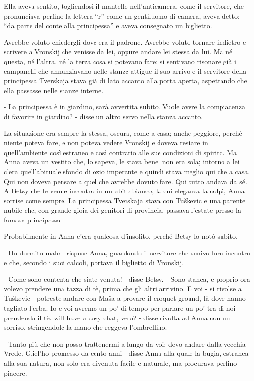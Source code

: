 Ella aveva sentito, togliendosi il mantello nell'anticamera, come il servitore, che pronunciava perfino la lettera ``r'' come un gentiluomo di camera, aveva detto: ``da parte del conte alla principessa'' e aveva consegnato un biglietto. 

Avrebbe voluto chiedergli dove era il padrone. Avrebbe voluto tornare indietro e scrivere a Vronskij che venisse da lei, oppure andare lei stessa da lui. Ma né questa, né l'altra, né la terza cosa si potevano fare: si sentivano risonare già i campanelli che annunziavano nelle stanze attigue il suo arrivo e il servitore della principessa Tverskaja stava già di lato accanto alla porta aperta, aspettando che ella passasse nelle stanze interne. 

- La principessa è in giardino, sarà avvertita subito. Vuole avere la compiacenza di favorire in giardino? - disse un altro servo nella stanza accanto. 

La situazione era sempre la stessa, oscura, come a casa; anche peggiore, perché niente poteva fare, e non poteva vedere Vronskij e doveva restare in quell'ambiente così estraneo e così contrario alle sue condizioni di spirito. Ma Anna aveva un vestito che, lo sapeva, le stava bene; non era sola; intorno a lei c'era quell'abituale sfondo di ozio imperante e quindi stava meglio qui che a casa. Qui non doveva pensare a quel che avrebbe dovuto fare. Qui tutto andava da sé. A Betsy che le venne incontro in un abito bianco, la cui eleganza la colpì, Anna sorrise come sempre. La principessa Tverskaja stava con Tuškevic e una parente nubile che, con grande gioia dei genitori di provincia, passava l'estate presso la famosa principessa. 

Probabilmente in Anna c'era qualcosa d'insolito, perché Betsy lo notò subito. 

- Ho dormito male - rispose Anna, guardando il servitore che veniva loro incontro e che, secondo i suoi calcoli, portava il biglietto di Vronskij. 

- Come sono contenta che siate venuta! - disse Betsy. - Sono stanca, e proprio ora volevo prendere una tazza di tè, prima che gli altri arrivino. E voi - si rivolse a Tuškevic - potreste andare con Maša a provare il croquet-ground, là dove hanno tagliato l'erba. Io e voi avremo un po' di tempo per parlare un po' tra di noi prendendo il tè: will have a cosy chat, vero? - disse rivolta ad Anna con un sorriso, stringendole la mano che reggeva l'ombrellino. 

- Tanto più che non posso trattenermi a lungo da voi; devo andare dalla vecchia Vrede. Gliel'ho promesso da cento anni - disse Anna alla quale la bugia, estranea alla sua natura, non solo era divenuta facile e naturale, ma procurava perfino piacere. 

